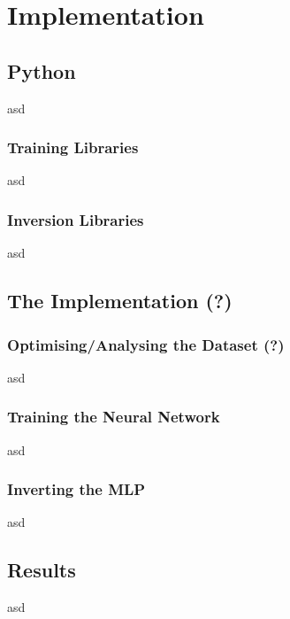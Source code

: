 \chapter{Implementation}



\section{Python}

asd


\subsection{Training Libraries}

asd


\subsection{Inversion Libraries}

asd




\section{The Implementation (?)}



\subsection{Optimising/Analysing the Dataset (?)}

asd


\subsection{Training the Neural Network}

asd


\subsection{Inverting the MLP}

asd




\section{Results}

asd